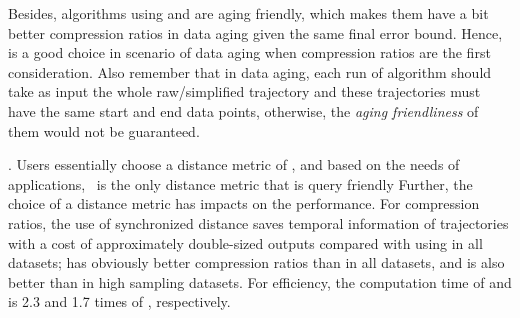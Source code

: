 {Besides, algorithms \dpa using \ped and \sed are aging friendly, which makes them have a bit better compression ratios in data aging given the same final error bound. Hence, \dpa is a good choice in scenario of data aging when compression ratios are the first consideration. Also remember that in data aging, each run of algorithm \dpa should take as input the whole raw/simplified trajectory and these trajectories must have the same start and end data points, otherwise, the \emph{aging friendliness} of them would not be guaranteed.}

. Users essentially choose a distance metric of \ped, \sed and \dad based on the needs of applications, \eg~\sed is the only distance metric that is query friendly 
%
Further, the choice of a distance metric has impacts on the performance.
For compression ratios, the use of synchronized distance \sed saves temporal information of trajectories with a cost of approximately double-sized outputs compared with using \ped in all datasets; \ped has obviously better compression ratios than \dad in all datasets, and \sed is also better than \dad in high sampling datasets.
For efficiency, the computation time of \ped and \sed is 2.3 and 1.7 times of \dad, respectively.



%
%
